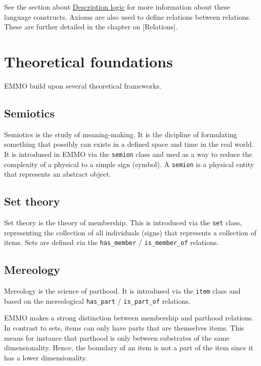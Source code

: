 \documentclass[a4paper,]{report}
\begin{document}
See the section about \protect\hyperlink{description-logic}{Description
logic} for more information about these language constructs. Axioms are
also used to define relations between relations. These are further
detailed in the chapter on {[}Relations{]}.

\hypertarget{theoretical-foundations}{%
\section{Theoretical foundations}\label{theoretical-foundations}}

EMMO build upon several theoretical frameworks.

\hypertarget{semiotics}{%
\subsection{Semiotics}\label{semiotics}}

Semiotics is the study of meaning-making. It is the dicipline of
formulating something that possibly can exists in a defined space and
time in the real world. It is introdused in EMMO via the \texttt{semion}
class and used as a way to reduce the complexity of a physical to a
simple sign (symbol). A \texttt{semion} is a physical entity that
represents an abstract object.

\hypertarget{set-theory}{%
\subsection{Set theory}\label{set-theory}}

Set theory is the theory of membership. This is introduced via the
\texttt{set} class, representing the collection of all individuals
(signs) that represents a collection of items. Sets are defined via the
\texttt{has\_member} / \texttt{is\_member\_of} relations.

\hypertarget{mereology}{%
\subsection{Mereology}\label{mereology}}

Mereology is the science of parthood. It is introdused via the
\texttt{item} class and based on the mereological \texttt{has\_part} /
\texttt{is\_part\_of} relations.

EMMO makes a strong distinction between membership and parthood
relations. In contrast to sets, items can only have parts that are
themselves items. This means for instance that parthood is only between
substrates of the same dimensionality. Hence, the boundary of an item is
not a part of the item since it has a lower dimensionality.
\end{document}
